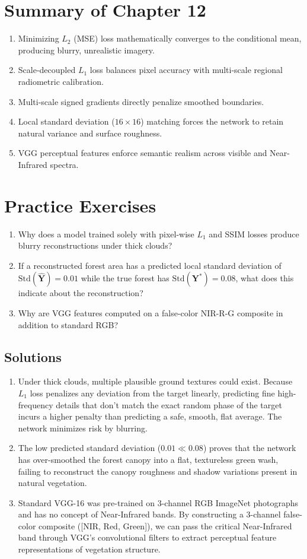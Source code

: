 \section{Summary of Chapter 12}
\begin{enumerate}
    \item Minimizing $L_2$ (MSE) loss mathematically converges to the conditional mean, producing blurry, unrealistic imagery.
    \item Scale-decoupled $L_1$ loss balances pixel accuracy with multi-scale regional radiometric calibration.
    \item Multi-scale signed gradients directly penalize smoothed boundaries.
    \item Local standard deviation ($16 \times 16$) matching forces the network to retain natural variance and surface roughness.
    \item VGG perceptual features enforce semantic realism across visible and Near-Infrared spectra.
\end{enumerate}

\section{Practice Exercises}
\begin{enumerate}
    \item Why does a model trained solely with pixel-wise $L_1$ and SSIM losses produce blurry reconstructions under thick clouds?
    \item If a reconstructed forest area has a predicted local standard deviation of $\text{Std}(\hat{\mathbf{Y}}) = 0.01$ while the true forest has $\text{Std}(\mathbf{Y}^*) = 0.08$, what does this indicate about the reconstruction?
    \item Why are VGG features computed on a false-color NIR-R-G composite in addition to standard RGB?
\end{enumerate}

\subsection*{Solutions}
\begin{enumerate}
    \item Under thick clouds, multiple plausible ground textures could exist. Because $L_1$ loss penalizes any deviation from the target linearly, predicting fine high-frequency details that don't match the exact random phase of the target incurs a higher penalty than predicting a safe, smooth, flat average. The network minimizes risk by blurring.
    \item The low predicted standard deviation ($0.01 \ll 0.08$) proves that the network has over-smoothed the forest canopy into a flat, textureless green wash, failing to reconstruct the canopy roughness and shadow variations present in natural vegetation.
    \item Standard VGG-16 was pre-trained on 3-channel RGB ImageNet photographs and has no concept of Near-Infrared bands. By constructing a 3-channel false-color composite ([NIR, Red, Green]), we can pass the critical Near-Infrared band through VGG's convolutional filters to extract perceptual feature representations of vegetation structure.
\end{enumerate}
